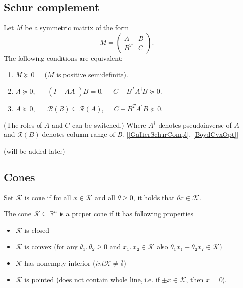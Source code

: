\documentclass[12pt]{book}
\theoremstyle{definition}
\begin{document}

\begin{appendix}


\chapter{ }
\section{Schur complement}

\label{SchurCompl}
Let $M$ be a symmetric matrix of the form
$$M = \left(\begin{array}{cc}
A & B\\
B^T & C
\end{array}\right).$$ 
The following conditions are equivalent:
\begin{enumerate}
\item $M\succeq 0$\ \ \ ($M$ is positive semidefinite).
\item $A\succeq 0$, \ \ \ $(I-AA^\dagger)B = 0$,\ \ \ $C - B^TA^\dagger B \succeq 0$.
\item $A\succeq 0$, \ \ \ $\mathcal{R}(B)\subseteq \mathcal{R}(A)$,\ \ \ $C - B^TA^\dagger B \succeq 0$.
\end{enumerate}
(The roles of $A$ and $C$ can be switched.)
Where $A^\dagger$ denotes pseudoinverse of $A$ and $\mathcal{R}(B)$ denotes column range of $B$. \rm [\ref{GallierSchurCompl}, \ref{BoydCvxOpt}]

\proof (will be added later)


\section{Cones}
\label{Cones}

\label{defCone}
Set $\mathcal{K}$ is cone if for all $x\in \mathcal{K}$ and all $\theta\geq 0$, it holds that $\theta x \in \mathcal{K}$.

\label{defProperCone}
The cone $\mathcal{K}\subseteq \mathbb{R}^n$ is a proper cone if it has following properties
\begin{itemize}
\item $\mathcal{K}$ is closed
\item $\mathcal{K}$ is convex (for any $\theta_1,\theta_2\geq 0$ and $x_1,x_2\in\mathcal{K}$ also $\theta_1x_1 + \theta_2x_2 \in\mathcal{K}$)
\item $\mathcal{K}$ has nonempty interior  ($int \mathcal{K} \neq \emptyset$)
\item $\mathcal{K}$ is pointed (does not contain whole line, i.e. if $\pm x\in \mathcal{K}$, then $x=0$).
\end{itemize}


\end{appendix}
\end{document}
